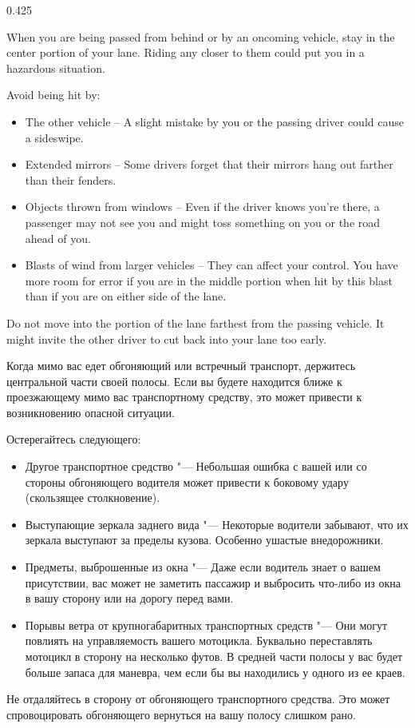 \begin{langblock}{0.425}
	\begin{eng}
	When you are being passed from behind or by an oncoming vehicle, stay in the center portion of your lane.  Riding any closer to them could put you in a hazardous situation. 
	
	Avoid being hit by:
	
	\begin{itemize}[noitemsep]
		\item The other vehicle -- A slight mistake by you or the passing driver could cause a sideswipe.
		\item Extended mirrors -- Some drivers forget that their mirrors hang out farther than their fenders.
		\item Objects thrown from windows -- Even if the driver knows you're there, a passenger may not see you and might toss something on you or the road ahead of you.	
		\item Blasts of wind from larger vehicles -- They can affect your control. You have more room for error if you are in the middle portion when hit by this blast than if you are on either side of the lane.
		
	\end{itemize}
	
	
	Do not move into the portion of the lane farthest from the passing vehicle. It might invite the other driver to cut back into your lane too early.
	\end{eng}
	\begin{rus}
		Когда мимо вас едет обгоняющий или встречный транспорт, держитесь центральной части своей полосы. Если вы будете находится ближе к проезжающему мимо вас транспортному средству, это может привести к возникновению опасной ситуации.
		
		Остерегайтесь следующего:
		
		\begin{itemize}[noitemsep]
			\item Другое транспортное средство "--- Небольшая ошибка с вашей или со стороны обгоняющего водителя может привести к боковому удару (скользящее столкновение).
			\item Выступающие зеркала заднего вида "--- Некоторые водители забывают, что их зеркала выступают за пределы кузова. Особенно ушастые внедорожники.
			\item Предметы, выброшенные из окна "--- Даже если водитель знает о вашем присутствии, вас может не заметить пассажир и выбросить что-либо из окна в вашу сторону или на дорогу перед вами.
			\item Порывы ветра от крупногабаритных транспортных средств "--- Они могут повлиять на управляемость вашего мотоцикла. Буквально переставлять мотоцикл в сторону на несколько футов. В средней части полосы у вас будет больше запаса для маневра, чем если бы вы находились у одного из ее краев.
		\end{itemize}
		
		
		Не отдаляйтесь в сторону от обгоняющего транспортного средства. Это может спровоцировать обгоняющего вернуться на вашу полосу слишком рано.
\end{rus}
\end{langblock}
